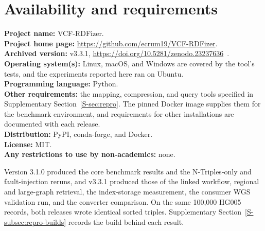 \documentclass[pdflatex,sn-mathphys-num,referee]{sn-jnl}
\begin{document}
\section*{Availability and requirements}
\textbf{Project name:} VCF-RDFizer.\\
\textbf{Project home page:} \url{https://github.com/ecrum19/VCF-RDFizer}.\\
\textbf{Archived version:} v3.3.1, \url{https://doi.org/10.5281/zenodo.23237636}~\cite{vcfrdfizer_v331}.\\
\textbf{Operating system(s):} Linux, macOS, and Windows are covered by the tool's tests, and the experiments reported here ran on Ubuntu.\\
\textbf{Programming language:} Python.\\
\textbf{Other requirements:} the mapping, compression, and query tools specified in Supplementary Section~\ref{S-sec:repro}.
The pinned Docker image supplies them for the benchmark environment, and requirements for other installations are documented with each release.\\
\textbf{Distribution:} PyPI, conda-forge, and Docker.\\
\textbf{License:} MIT.\\
\textbf{Any restrictions to use by non-academics:} none.

Version 3.1.0 produced the core benchmark results and the N-Triples-only and fault-injection reruns, and v3.3.1 produced those of the linked workflow, regional and large-graph retrieval, the index-storage measurement, the consumer WGS validation run, and the converter comparison.
On the same 100,000 HG005 records, both releases wrote identical sorted triples.
Supplementary Section~\ref{S-subsec:repro-builds} records the build behind each result.
\end{document}
